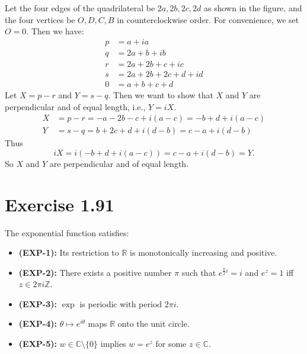 \documentclass{article}
\begin{document}
\begin{solution}
  Let the four edges of the quadrilateral be $2a, 2b, 2c, 2d$ as
  shown in the figure, and the four vertices be $O, D, C, B$ in
  counterclockwise order. For convenience, we set $O = 0$.
  Then we have:
  \[
    \begin{aligned}
      p &= a + ia \\
      q &= 2a + b + ib \\
      r &= 2a + 2b + c + ic \\
      s &= 2a + 2b + 2c + d + id \\
      0 &= a+b+c+d
    \end{aligned}
  \]
  Let $X = p - r$ and $Y = s - q$. Then we want to show that $X$ and
  $Y$ are perpendicular and of equal length, i.e., $Y = iX$.
  \[
    \begin{aligned}
      X &= p-r = -a - 2b - c + i(a - c) = -b+d+i(a-c) \\
      Y &= s-q = b + 2c + d + i (d - b) = c-a+i(d-b)
    \end{aligned}
  \]
  Thus \[
    iX = i(-b+d+i(a-c)) = c-a + i(d-b) = Y.
  \]
  So $X$ and $Y$ are perpendicular and of equal length.

\end{solution}

\section{Exercise 1.91}

\begin{lemma}
  The exponential function satisfies:
  \begin{itemize}
    \item \textbf{(EXP-1):} Its restriction to $\mathbb{R}$ is
      monotonically increasing and positive.
    \item \textbf{(EXP-2):} There exists a positive number $\pi$ such
      that $e^{\frac{\pi}{2} i} = i$ and $e^z = 1$ iff $z \in 2\pi i
      \mathbb{Z}$.
    \item \textbf{(EXP-3):} $\exp$ is periodic with period $2\pi i$.
    \item \textbf{(EXP-4):} $\theta \mapsto e^{i\theta}$ maps
      $\mathbb{R}$ onto the unit circle.
    \item \textbf{(EXP-5):} $w \in \mathbb{C} \setminus \{0\}$
      implies $w = e^z$ for some $z \in \mathbb{C}$.
  \end{itemize}
\end{lemma}
\end{document}
